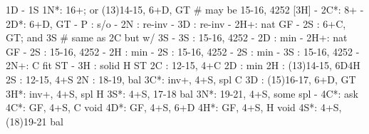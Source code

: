 1D - 1S
1N*: 16+; or (13)14-15, 6+D, GT  # may be 15-16, 4252 [3H]
   - 2C*: 8+
        - 2D*: 6+D, GT
            - P  : s/o
            - 2N : re-inv
            - 3D : re-inv
        - 2H+: nat GF
        - 2S : 6+C, GT; and 3S  # same as 2C but w/ 3S
        - 3S : 15-16, 4252
   - 2D : min
        - 2H+: nat GF
        - 2S : 15-16, 4252
   - 2H : min 
        - 2S : 15-16, 4252
   - 2S : min
        - 3S : 15-16, 4252
   - 2N+: C fit ST
   - 3H : solid H ST
2C : 12-15, 4+C
2D : min
2H : (13)14-15, 6D4H
2S : 12-15, 4+S
2N : 18-19, bal
3C*: inv+, 4+S, spl C
3D : (15)16-17, 6+D, GT
3H*: inv+, 4+S, spl H
3S*: 4+S, 17-18 bal
3N*: 19-21, 4+S, some spl
   - 4C*: ask
4C*: GF, 4+S, C void
4D*: GF, 4+S, 6+D 
4H*: GF, 4+S, H void 
4S*: 4+S, (18)19-21 bal